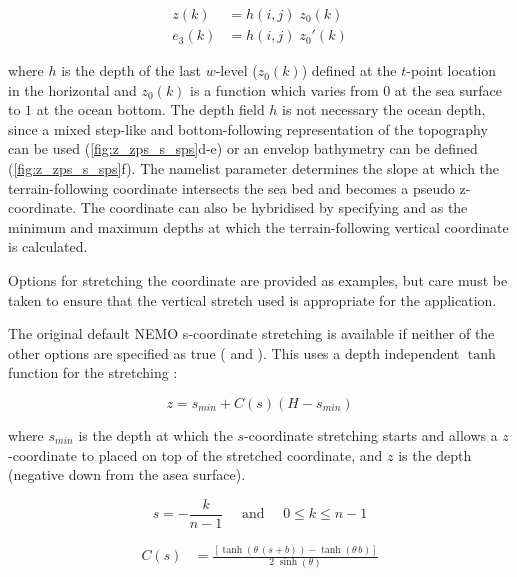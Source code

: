 \documentclass[../tex_main/NEMO_manual]{subfiles}
\begin{document}
\begin{equation} \label{eq:DOM_sco_ana}
\begin{split}
 z(k) 		&= h(i,j) \; z_0(k)	\\
 e_3(k)	&= h(i,j) \; z_0'(k)
\end{split}
\end{equation}

where $h$ is the depth of the last $w$-level ($z_0(k)$) defined at the $t$-point location in the horizontal and
$z_0(k)$ is a function which varies from $0$ at the sea surface to $1$ at the ocean bottom.
The depth field $h$ is not necessary the ocean depth,
since a mixed step-like and bottom-following representation of the topography can be used
(\autoref{fig:z_zps_s_sps}d-e) or an envelop bathymetry can be defined (\autoref{fig:z_zps_s_sps}f).
The namelist parameter  determines the slope at which
the terrain-following coordinate intersects the sea bed and becomes a pseudo z-coordinate. 
The coordinate can also be hybridised by specifying  and  as
the minimum and maximum depths at which the terrain-following vertical coordinate is calculated.

Options for stretching the coordinate are provided as examples,
but care must be taken to ensure that the vertical stretch used is appropriate for the application.

The original default NEMO s-coordinate stretching is available if neither of the other options are specified as true
( and ). 
This uses a depth independent $\tanh$ function for the stretching \citep{Madec_al_JPO96}:

\begin{equation}
  z = s_{min}+C\left(s\right)\left(H-s_{min}\right)
  \label{eq:SH94_1}
\end{equation}

where $s_{min}$ is the depth at which the $s$-coordinate stretching starts and
allows a $z$-coordinate to placed on top of the stretched coordinate,
and $z$ is the depth (negative down from the asea surface).

\begin{equation}
  s = -\frac{k}{n-1} \quad \text{ and } \quad 0 \leq k \leq n-1
  \label{eq:DOM_s}
\end{equation}

\begin{equation} \label{eq:DOM_sco_function}
\begin{split}
C(s)	&=  \frac{ \left[	  \tanh{ \left( \theta \, (s+b) \right)} 
	  	 			- \tanh{ \left(  \theta \, b      \right)}  \right]}
		      {2\;\sinh \left( \theta \right)}
\end{split}
\end{equation}
\end{document}
